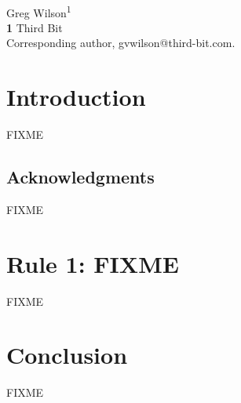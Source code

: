\documentclass[10pt,letterpaper]{article}
\begin{document}
\vspace*{0.2in}

\begin{flushleft}
{\Large
\textbf{}
}
\newline
\\
{Greg Wilson}\textsuperscript{1{\ddag}}
\\
\bigskip
\textbf{1} Third Bit\\
{\ddag} Corresponding author, gvwilson@third-bit.com.
\end{flushleft}

\section*{Introduction}

FIXME

\subsection*{Acknowledgments}

FIXME

\section*{Rule 1: FIXME}

FIXME

\section*{Conclusion}

FIXME

\nocite{*}

\end{document}
